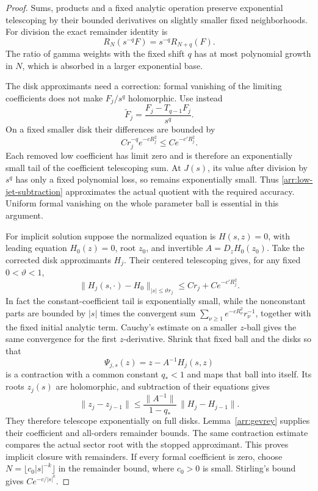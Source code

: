 \begin{proof}
Sums, products and a fixed analytic operation preserve
exponential telescoping by their bounded derivatives on
slightly smaller fixed neighborhoods.
For division the exact remainder identity is
\[
 R_N(s^{-q}F)=s^{-q}R_{N+q}(F).
\]
The ratio of gamma weights with the fixed shift \(q\)
has at most polynomial growth in \(N\), which is absorbed
in a larger exponential base.

The disk approximants need a correction:
formal vanishing of the limiting coefficients does not
make \(F_j/s^q\) holomorphic.  Use instead
\begin{equation}\label{arr:low-jet-subtraction}
 \widetilde F_j=\frac{F_j-T_{q-1}F_j}{s^q}.
\end{equation}
On a fixed smaller disk their differences are bounded by
\[
 C r_j^{-q}e^{-cR_j^2}\le C e^{-c'R_j^2}.
\]
Each removed low coefficient has limit zero and is therefore
an exponentially small tail of the coefficient telescoping
sum.  At \(J(s)\), its value after division by \(s^q\)
has only a fixed polynomial loss, so remains exponentially
small.  Thus \eqref{arr:low-jet-subtraction} approximates the
actual quotient with the required accuracy.
Uniform formal vanishing on the whole parameter ball is
essential in this argument.

For implicit solution suppose the normalized equation is
\(H(s,z)=0\), with leading equation \(H_0(z)=0\), root \(z_0\),
and invertible \(A=D_zH_0(z_0)\).
Take the corrected disk approximants \(H_j\).
Their centered telescoping gives, for any fixed
\(0<\vartheta<1\),
\[
 \|H_j(s,\cdot)-H_0\|_{|s|\le\vartheta r_j}
       \le C r_j+C e^{-c'R_j^2}.
\]
In fact the constant-coefficient tail is exponentially small,
while the nonconstant parts are bounded by \(|s|\) times
the convergent sum
\(\sum_{\nu\ge1}e^{-cR_\nu^2}r_\nu^{-1}\), together with
the fixed initial analytic term.  Cauchy's estimate on a
smaller \(z\)-ball gives the same convergence for the
first \(z\)-derivative.  Shrink that fixed ball and the
disks so that
\[
 \Psi_{j,s}(z)=z-A^{-1}H_j(s,z)
\]
is a contraction with a common constant \(q_*<1\) and maps
that ball into itself.  Its roots \(z_j(s)\) are holomorphic,
and subtraction of their equations gives
\[
 \|z_j-z_{j-1}\|
 \le\frac{\|A^{-1}\|}{1-q_*}\,
          \|H_j-H_{j-1}\|.
\]
They therefore telescope exponentially on full disks.
Lemma~\ref{arr:gevrey} supplies their coefficient and
all-orders remainder bounds.  The same contraction estimate
compares the actual sector root with the stopped approximant.
This proves implicit closure with remainders.
If every formal coefficient is zero, choose
\(N=\lfloor c_0|s|^{-k}\rfloor\) in the remainder bound,
where \(c_0>0\) is small.  Stirling's bound gives
\(Ce^{-c/|s|^k}\).
\end{proof}

